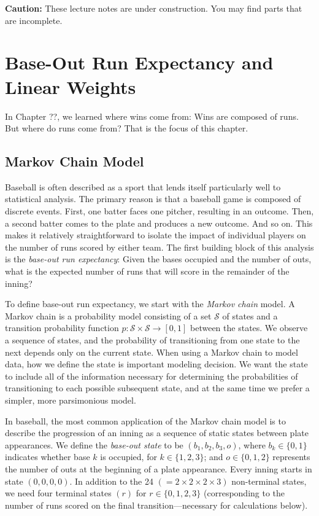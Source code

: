 \documentclass{article}
\begin{document}
\begin{framed}
  {\bf Caution:} These lecture notes are under construction. You may find parts that are incomplete.
\end{framed}

  \setcounter{section}{1}
  \section{\sc Base-Out Run Expectancy and Linear Weights}

    In Chapter ??, we learned where wins come from: Wins are composed of runs. But where do runs come from? That is the focus of this chapter.

    \subsection{\sc Markov Chain Model}

      Baseball is often described as a sport that lends itself particularly well to statistical analysis. The primary reason is that a baseball game is composed of discrete events. First, one batter faces one pitcher, resulting in an outcome. Then, a second batter comes to the plate and produces a new outcome. And so on. This makes it relatively straightforward to isolate the impact of individual players on the number of runs scored by either team. The first building block of this analysis is the {\it base-out run expectancy}: Given the bases occupied and the number of outs, what is the expected number of runs that will score in the remainder of the inning?

      To define base-out run expectancy, we start with the {\it Markov chain} model. A Markov chain is a probability model consisting of a set $\mathcal S$ of states and a transition probability function $p : \mathcal S \times \mathcal S \rightarrow [0, 1]$ between the states. We observe a sequence of states, and the probability of transitioning from one state to the next depends only on the current state. When using a Markov chain to model data, how we define the state is important modeling decision. We want the state to include all of the information necessary for determining the probabilities of transitioning to each possible subsequent state, and at the same time we prefer a simpler, more parsimonious model.

      In baseball, the most common application of the Markov chain model is to describe the progression of an inning as a sequence of static states between plate appearances. We define the {\it base-out state} to be $(b_1, b_2, b_3, o)$, where $b_k \in \{0, 1\}$ indicates whether base $k$ is occupied, for $k \in \{1, 2, 3\}$; and $o \in \{0, 1, 2\}$ represents the number of outs at the beginning of a plate appearance. Every inning starts in state $(0, 0, 0, 0)$. In addition to the 24 $(= 2 \times 2 \times 2 \times 3)$ non-terminal states, we need four terminal states $(r)$ for $r \in \{0, 1, 2, 3\}$ (corresponding to the number of runs scored on the final transition---necessary for calculations below).
\end{document}
